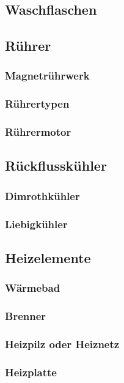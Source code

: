 \subsection{Waschflaschen}

\subsection{Rührer}
\subsubsection{Magnetrührwerk}
\subsubsection{Rührertypen}
\subsubsection{Rührermotor}

\subsection{Rückflusskühler}
\subsubsection{Dimrothkühler}
\subsubsection{Liebigkühler}

\subsection{Heizelemente}
\subsubsection{Wärmebad}
\subsubsection{Brenner}
\subsubsection{Heizpilz oder Heiznetz}
\subsubsection{Heizplatte}


